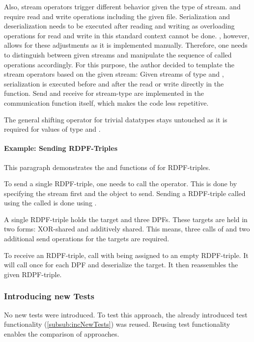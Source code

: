 Also, stream operators trigger different behavior given the type of stream.
 and  require read and write operations including the given file.
Serialization and deserialization needs to be executed after reading and writing as overloading operations for read and write in this standard context cannot be done.
, however, allows for these adjustments as it is implemented manually.
Therefore, one needs to distinguish between given streams and manipulate the sequence of called operations accordingly.
For this purpose, the author decided to template the stream operators based on the given stream:
Given streams of type  and , serialization is executed before and after the read or write directly in the function.
Send and receive for stream-type  are implemented in the communication function itself, which makes the code less repetitive.

The general shifting operator for trivial datatypes stays untouched as it is required for values of type  and .

\paragraph{Example: Sending RDPF-Triples}\label{par:exampleSendingRDPFTriples}
This paragraph demonstrates the  and  functions of  for RDPF-triples.

To send a single RDPF-triple, one needs to call the \code{>>} operator.
This is done by specifying the stream first and the object to send.
Sending a RDPF-triple called  using the  called  is done using .

A single RDPF-triple holds the target and three DPFs.
These targets are held in two forms: XOR-shared and additively shared.
This means, three calls of  and two additional send operations for the targets are required.

To receive an RDPF-triple, call  with  being assigned to an empty RDPF-triple.
It will call  once for each DPF and deserialize the target.
It then reassembles the given RDPF-triple.

\subsubsection*{Introducing new Tests}\label{subsub:gmpTests}
No new tests were introduced.
To test this approach, the already introduced  test functionality (\ref{subsub:incNewTests}) was reused.
Reusing test functionality enables the comparison of approaches.